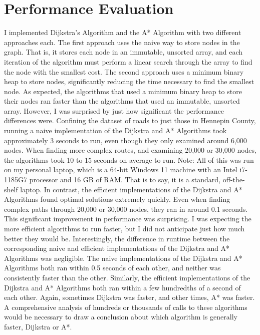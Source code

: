 \documentclass[conference]{IEEEtran}
\begin{document}
\section{Performance Evaluation}
I implemented Dijkstra's Algorithm and the A* Algorithm with two different approaches each. The first approach uses the naive way to store nodes in the graph. That is, it stores each node in an immutable, unsorted array, and each iteration of the algorithm must perform a linear search through the array to find the node with the smallest cost. The second approach uses a minimum binary heap to store nodes, significantly reducing the time necessary to find the smallest node.
\newline
\newline
As expected, the algorithms that used a minimum binary heap to store their nodes ran faster than the algorithms that used an immutable, unsorted array. However, I was surprised by just how significant the performance differences were. Confining the dataset of roads to just those in Hennepin County, running a naive implementation of the Dijkstra and A* Algorithms took approximately 3 seconds to run, even though they only examined around 6,000 nodes. When finding more complex routes, and examining 20,000 or 30,000 nodes, the algorithms took 10 to 15 seconds on average to run.
\newline
\newline
Note: All of this was run on my personal laptop, which is a 64-bit Windows 11 machine with an Intel i7-1185G7 processor and 16 GB of RAM. That is to say, it is a standard, off-the-shelf laptop.
\newline
\newline
In contrast, the efficient implementations of the Dijkstra and A* Algorithms found optimal solutions extremely quickly. Even when finding complex paths through 20,000 or 30,000 nodes, they ran in around 0.1 seconds. This significant improvement in performance was surprising. I was expecting the more efficient algorithms to run faster, but I did not anticipate just how much better they would be.
\newline
\newline
Interestingly, the difference in runtime between the corresponding naive and efficient implementations of the Dijkstra and A* Algorithms was negligible. The naive implementations of the Dijkstra and A* Algorithms both ran within 0.5 seconds of each other, and neither was consistently faster than the other. Similarly, the efficient implementations of the Dijkstra and A* Algorithms both ran within a few hundredths of a second of each other. Again, sometimes Dijkstra was faster, and other times, A* was faster. A comprehensive analysis of hundreds or thousands of calls to these algorithms would be necessary to draw a conclusion about which algorithm is generally faster, Dijkstra or A*.
\end{document}
